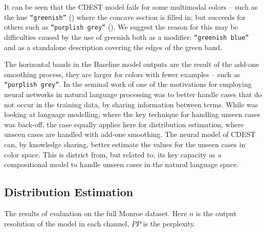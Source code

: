 \documentclass[11pt,letterpaper]{article}
\newcommand{\textcite}{\newcite}
\begin{document}
It can be seen that the CDEST model fails for some multimodal colors -- such as the hue \texttt{``greenish''} () where the concave section is filled in;
but succeeds for others such as \texttt{``purplish grey''} ().
We suggest the reason for this may be difficulties caused by the use of greenish both as a modifier: \texttt{``greenish blue''} and as a standalone description covering the edges of the green band.

The horizontal bands in the Baseline model outputs are the result of the add-one smoothing process, they are larger for colors with fewer examples -- such as \texttt{``purplish grey''}.
In the seminal work of \textcite{NPLM} one of the motivations for employing neural networks in natural language processing was to better handle cases that do not occur in the training data, by sharing information between terms.
While \textcite{NPLM} was looking at language modelling, where the key technique for handling unseen cases was back-off, the case equally applies here for distribution estimation, where unseen cases are handled with add-one smoothing.
The neural model of CDEST can, by knowledge sharing, better estimate the values for the unseen cases in color space.
This is district from, but related to, its key capacity as a compositional model to handle unseen cases in the natural language space.
 


\subsection{Distribution Estimation}

\begin{table}
	\centering
	\caption{\label{tblresfull} The results of evaluation on the full Monroe  dataset. Here $n$ is the output resolution of the model in each channel, $PP$ is the perplexity.}
\end{table}
\end{document}

